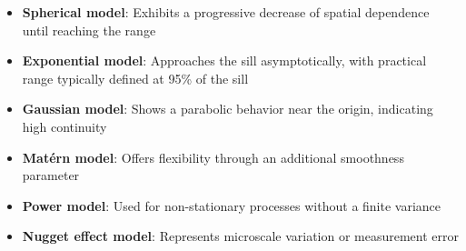 \documentclass[12pt,a4paper,oneside]{report}
\begin{document}
\begin{itemize} 
    \item \textbf{Spherical model}: Exhibits a progressive decrease of spatial dependence until reaching the range 
    \item \textbf{Exponential model}: Approaches the sill asymptotically, with practical range typically defined at 95\% of the sill 
    \item \textbf{Gaussian model}: Shows a parabolic behavior near the origin, indicating high continuity 
    \item \textbf{Matérn model}: Offers flexibility through an additional smoothness parameter 
    \item \textbf{Power model}: Used for non-stationary processes without a finite variance 
    \item \textbf{Nugget effect model}: Represents microscale variation or measurement error 
\end{itemize}
\end{document}
